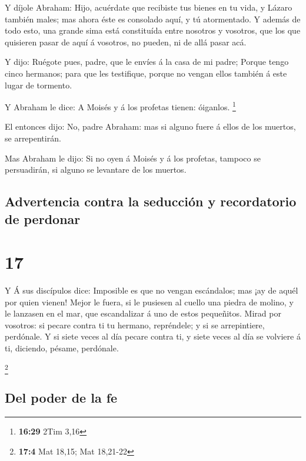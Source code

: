  Y díjole Abraham: Hijo, acuérdate que recibiste tus
bienes en tu vida, y Lázaro también males; mas ahora éste es consolado
aquí, y tú atormentado.  Y además de todo esto, una
grande sima está constituída entre nosotros y vosotros, que los que
quisieren pasar de aquí á vosotros, no pueden, ni de allá pasar acá.

 Y dijo: Ruégote pues, padre, que le envíes á la casa de
mi padre;  Porque tengo cinco hermanos; para que les
testifique, porque no vengan ellos también á este lugar de tormento.

 Y Abraham le dice: A Moisés y á los profetas tienen:
óiganlos. \footnote{\textbf{16:29} 2Tim 3,16}

 El entonces dijo: No, padre Abraham: mas si alguno fuere
á ellos de los muertos, se arrepentirán.

 Mas Abraham le dijo: Si no oyen á Moisés y á los
profetas, tampoco se persuadirán, si alguno se levantare de los muertos.

\hypertarget{advertencia-contra-la-seducciuxf3n-y-recordatorio-de-perdonar}{%
\subsection{Advertencia contra la seducción y recordatorio de
perdonar}\label{advertencia-contra-la-seducciuxf3n-y-recordatorio-de-perdonar}}

\hypertarget{section-16}{%
\section{17}\label{section-16}}

 Y Á sus discípulos dice: Imposible es que no vengan
escándalos; mas ¡ay de aquél por quien vienen!  Mejor le
fuera, si le pusiesen al cuello una piedra de molino, y le lanzasen en
el mar, que escandalizar á uno de estos pequeñitos.  Mirad
por vosotros: si pecare contra ti tu hermano, repréndele; y si se
arrepintiere, perdónale.  Y si siete veces al día pecare
contra ti, y siete veces al día se volviere á ti, diciendo, pésame,
perdónale.

\footnote{\textbf{17:4} Mat 18,15; Mat 18,21-22}

\hypertarget{del-poder-de-la-fe}{%
\subsection{Del poder de la fe}\label{del-poder-de-la-fe}}

